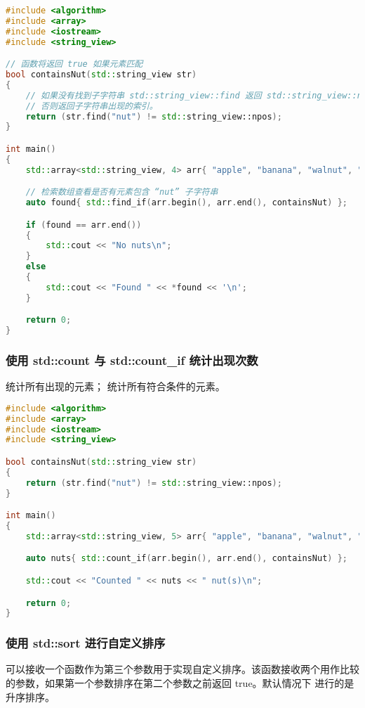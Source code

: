 \documentclass[../../LearnCpp.tex]{subfiles}
\begin{document}
\begin{lstlisting}[language=C++]
#include <algorithm>
#include <array>
#include <iostream>
#include <string_view>

// 函数将返回 true 如果元素匹配
bool containsNut(std::string_view str)
{
    // 如果没有找到子字符串 std::string_view::find 返回 std::string_view::npos
    // 否则返回子字符串出现的索引。
    return (str.find("nut") != std::string_view::npos);
}

int main()
{
    std::array<std::string_view, 4> arr{ "apple", "banana", "walnut", "lemon" };

    // 检索数组查看是否有元素包含 “nut” 子字符串
    auto found{ std::find_if(arr.begin(), arr.end(), containsNut) };

    if (found == arr.end())
    {
        std::cout << "No nuts\n";
    }
    else
    {
        std::cout << "Found " << *found << '\n';
    }

    return 0;
}
\end{lstlisting}

\subsubsection*{使用 std::count 与 std::count\_if 统计出现次数}

 统计所有出现的元素；  统计所有符合条件的元素。

\begin{lstlisting}[language=C++]
#include <algorithm>
#include <array>
#include <iostream>
#include <string_view>

bool containsNut(std::string_view str)
{
    return (str.find("nut") != std::string_view::npos);
}

int main()
{
    std::array<std::string_view, 5> arr{ "apple", "banana", "walnut", "lemon", "peanut" };

    auto nuts{ std::count_if(arr.begin(), arr.end(), containsNut) };

    std::cout << "Counted " << nuts << " nut(s)\n";

    return 0;
}
\end{lstlisting}

\subsubsection*{使用 std::sort 进行自定义排序}

 可以接收一个函数作为第三个参数用于实现自定义排序。该函数接收两个用作比较的参数，如果第一个参数排序在第二个参数之前返回 true。默认情况下  进行的是升序排序。
\end{document}

